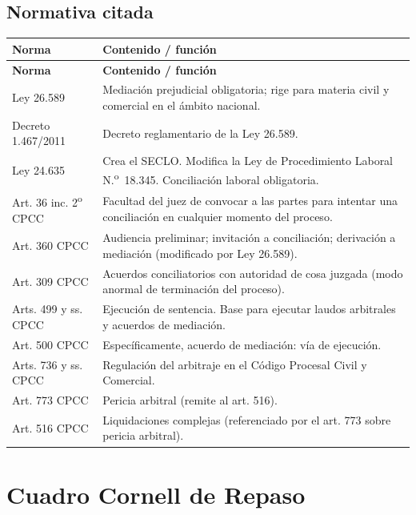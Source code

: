\documentclass[12pt,oneside]{book}
\begin{document}
\section{Normativa citada}

\begin{longtable}{@{}>{\raggedright\arraybackslash}p{} >{\raggedright\arraybackslash}X@{}}
\toprule
\textbf{Norma} & \textbf{Contenido / función} \\
\midrule
\endfirsthead
\toprule
\textbf{Norma} & \textbf{Contenido / función} \\
\midrule
\endhead
Ley 26.589 & Mediación prejudicial obligatoria; rige para materia civil y comercial en el ámbito nacional. \\
Decreto 1.467/2011 & Decreto reglamentario de la Ley 26.589. \\
Ley 24.635 & Crea el SECLO. Modifica la Ley de Procedimiento Laboral N.\textsuperscript{o}~18.345. Conciliación laboral obligatoria. \\
Art. 36 inc. 2\textsuperscript{o} CPCC & Facultad del juez de convocar a las partes para intentar una conciliación en cualquier momento del proceso. \\
Art. 360 CPCC & Audiencia preliminar; invitación a conciliación; derivación a mediación (modificado por Ley 26.589). \\
Art. 309 CPCC & Acuerdos conciliatorios con autoridad de cosa juzgada (modo anormal de terminación del proceso). \\
Arts. 499 y ss. CPCC & Ejecución de sentencia. Base para ejecutar laudos arbitrales y acuerdos de mediación. \\
Art. 500 CPCC & Específicamente, acuerdo de mediación: vía de ejecución. \\
Arts. 736 y ss. CPCC & Regulación del arbitraje en el Código Procesal Civil y Comercial. \\
Art. 773 CPCC & Pericia arbitral (remite al art. 516). \\
Art. 516 CPCC & Liquidaciones complejas (referenciado por el art. 773 sobre pericia arbitral). \\
\bottomrule
\end{longtable}

\chapter{Cuadro Cornell de Repaso}
\end{document}
